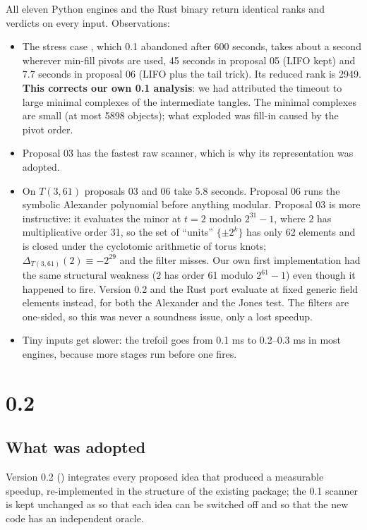 All eleven Python engines and the Rust binary return identical ranks and
verdicts on every input. Observations:
\begin{itemize}
\item The stress case , which 0.1 abandoned after 600 seconds,
  takes about a second wherever min-fill pivots are used, 45 seconds in
  proposal 05 (LIFO kept) and 7.7 seconds in proposal 06 (LIFO plus the tail
  trick). Its reduced rank is 2949. \textbf{This corrects our own 0.1
  analysis}: we had attributed the timeout to large minimal complexes of the
  intermediate tangles. The minimal complexes are small (at most 5898
  objects); what exploded was fill-in caused by the pivot order.
\item Proposal 03 has the fastest raw scanner, which is why its
  representation was adopted.
\item On $T(3,61)$ proposals 03 and 06 take 5.8 seconds. Proposal 06 runs the
  symbolic Alexander polynomial before anything modular. Proposal 03 is more
  instructive: it evaluates the minor at $t=2$ modulo $2^{31}-1$, where $2$
  has multiplicative order 31, so the set of ``units'' $\{\pm2^k\}$ has only
  62 elements and is closed under the cyclotomic arithmetic of torus knots;
  $\Delta_{T(3,61)}(2)\equiv-2^{29}$ and the filter misses. Our own first
  implementation had the same structural weakness ($2$ has order 61 modulo
  $2^{61}-1$) even though it happened to fire. Version 0.2 and the Rust port
  evaluate at fixed generic field elements instead, for both the Alexander and
  the Jones test. The filters are one-sided, so this was never a soundness
  issue, only a lost speedup.
\item Tiny inputs get slower: the trefoil goes from 0.1 ms to 0.2--0.3 ms in
  most engines, because more stages run before one fires.
\end{itemize}

\section{ 0.2}
\label{sec:v02}

\subsection{What was adopted}
Version 0.2 () integrates every proposed idea that produced a
measurable speedup, re-implemented in the structure of the existing package;
the 0.1 scanner is kept unchanged as  so that each idea
can be switched off and so that the new code has an independent oracle.

